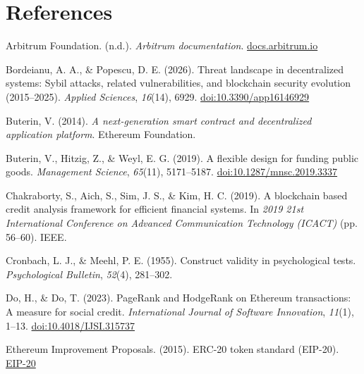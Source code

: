 \clearpage
{}
\section*{References}
\label{sec:references}

\hangindent=0.5in  Arbitrum Foundation. (n.d.). \textit{Arbitrum documentation}. \href{https://docs.arbitrum.io/}{docs.arbitrum.io}\par

\hangindent=0.5in  Bordeianu, A. A., \& Popescu, D. E. (2026). Threat landscape in decentralized systems: Sybil attacks, related vulnerabilities, and blockchain security evolution (2015--2025). \textit{Applied Sciences}, \textit{16}(14), 6929. \href{https://doi.org/10.3390/app16146929}{doi:10.3390/app16146929}\par

\hangindent=0.5in  Buterin, V. (2014). \textit{A next-generation smart contract and decentralized application platform}. Ethereum Foundation.\par

\hangindent=0.5in  Buterin, V., Hitzig, Z., \& Weyl, E. G. (2019). A flexible design for funding public goods. \textit{Management Science}, \textit{65}(11), 5171--5187. \href{https://doi.org/10.1287/mnsc.2019.3337}{doi:10.1287/mnsc.2019.3337}\par

\hangindent=0.5in  Chakraborty, S., Aich, S., Sim, J. S., \& Kim, H. C. (2019). A blockchain based credit analysis framework for efficient financial systems. In \textit{2019 21st International Conference on Advanced Communication Technology (ICACT)} (pp. 56--60). IEEE.\par

\hangindent=0.5in  Cronbach, L. J., \& Meehl, P. E. (1955). Construct validity in psychological tests. \textit{Psychological Bulletin}, \textit{52}(4), 281--302.\par

\hangindent=0.5in  Do, H., \& Do, T. (2023). PageRank and HodgeRank on Ethereum transactions: A measure for social credit. \textit{International Journal of Software Innovation}, \textit{11}(1), 1--13. \href{https://doi.org/10.4018/IJSI.315737}{doi:10.4018/IJSI.315737}\par

\hangindent=0.5in  Ethereum Improvement Proposals. (2015). ERC-20 token standard (EIP-20). \href{https://eips.ethereum.org/EIPS/eip-20}{EIP-20}\par

